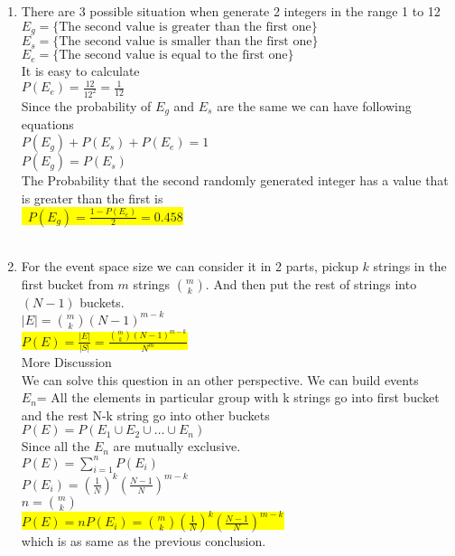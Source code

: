 \documentclass{article}
\begin{document}
\begin{enumerate}
\begin{enumerate}
	\end{enumerate}
	\item
	\begin{enumerate}
		\mysolu
		There are 3 possible situation when generate 2 integers in the range 1 to 12\\
		${E_g = \{\text{The second value is greater than the first one}\}}$\\
		${E_s = \{\text{The second value is smaller than the first one}\}}$\\
		${E_e = \{\text{The second value is equal to the first one}\}}$\\
		It is easy to calculate\\
		${P(E_e)=\frac{12}{12^2}=\frac{1}{12}}$\\
		Since the probability of ${E_g}$ and ${E_s}$ are the same we can have following equations\\
		${P(E_g)+P(E_s)+P(E_e) = 1}$\\
		${P(E_g)=P(E_s)}$\\
		\myansw
		The Probability that the second randomly generated integer has a value that is greater than the first is\\
		\colorbox{yellow}{\
			${P(E_g)= \frac{1-P(E_e)}{2}=0.458}$\\
		}\\
	\end{enumerate}
	\item
	\begin{enumerate}
		\mysolu
		For the event space size we can consider it in 2 parts, pickup ${k}$ strings in the first bucket from ${m}$ strings ${m \choose k}$. And then put the rest of strings into $(N-1)$ buckets.\\
		${|E| = {m \choose k}(N-1)^{m-k}}$\\
		\myansw
		\colorbox{yellow}{
			${P(E)=\frac{|E|}{|S|}=\frac{{m \choose k}(N-1)^{m-k}}{N^m}}$
		}\\
		
		More Discussion\\
		We can solve this question in an other perspective. We can build events\\
		${E_n}$= All the elements in particular group with k strings go into first bucket and the rest N-k string go into other buckets\\
		${P(E) = P(E_1\cup E_2\cup \ldots \cup E_n)}$\\
		Since all the ${E_n}$ are mutually exclusive.\\
		${P(E) = \sum\limits_{i=1}^n P(E_i)}$\\
		${P(E_i) = (\frac{1}{N})^k(\frac{N-1}{N})^{m-k}}$\\
		${n = {m \choose k}}$\\
		\colorbox{yellow}{
			${P(E)=nP(E_i)={m \choose k}(\frac{1}{N})^k(\frac{N-1}{N})^{m-k}}$
		}\\
		which is as same as the previous conclusion.
		

\end{enumerate}
\end{enumerate}
\end{document}
